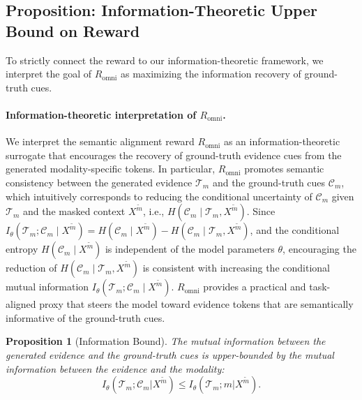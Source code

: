 \documentclass{article}
\theoremstyle{plain}
\newtheorem{proposition}[theorem]{Proposition}
\theoremstyle{definition}
\theoremstyle{remark}
\begin{document}
\subsection{Proposition: Information-Theoretic Upper Bound on Reward}
\label{proposition2}
To strictly connect the reward to our information-theoretic framework, we interpret the goal of $R_{\mathrm{omni}}$ as maximizing the information recovery of ground-truth cues.




\paragraph{Information-theoretic interpretation of $R_{\mathrm{omni}}$.}
We interpret the semantic alignment reward $R_{\mathrm{omni}}$ as an information-theoretic surrogate that encourages the recovery of ground-truth evidence cues from the generated modality-specific tokens. In particular, $R_{\mathrm{omni}}$ promotes semantic consistency between the generated evidence $\mathcal{T}_{m}$ and the ground-truth cues $\mathcal{C}_{m}$, which intuitively corresponds to reducing the conditional uncertainty of $\mathcal{C}_{m}$ given $\mathcal{T}_{m}$ and the masked context $X^{\tilde{m}}$, i.e., $H(\mathcal{C}_{m} \mid \mathcal{T}_{m}, X^{\tilde{m}})$.
Since $I_\theta(\mathcal{T}_{m}; \mathcal{C}_{m} \mid X^{\tilde{m}}) = H(\mathcal{C}_{m} \mid X^{\tilde{m}}) - H(\mathcal{C}_{m} \mid \mathcal{T}_{m}, X^{\tilde{m}})$, and the conditional entropy $H(\mathcal{C}_{m} \mid X^{\tilde{m}})$ is independent of the model parameters $\theta$, encouraging the reduction of $H(\mathcal{C}_{m} \mid \mathcal{T}_{m}, X^{\tilde{m}})$ is consistent with increasing the conditional mutual information $I_\theta(\mathcal{T}_{m}; \mathcal{C}_{m} \mid X^{\tilde{m}})$. $R_{\mathrm{omni}}$ provides a practical and task-aligned proxy that steers the model toward evidence tokens that are semantically informative of the ground-truth cues.


\begin{proposition}[Information Bound]
The mutual information between the generated evidence and the ground-truth cues is upper-bounded by the mutual information between the evidence and the modality:
\begin{equation}
    \label{eq:prop_bound}
    I_\theta(\mathcal{T}_{m}; \mathcal{C}_{m} | X^{\tilde{m}}) \leq I_\theta(\mathcal{T}_{m}; m | X^{\tilde{m}}).
\end{equation}
\end{proposition}
\end{document}
